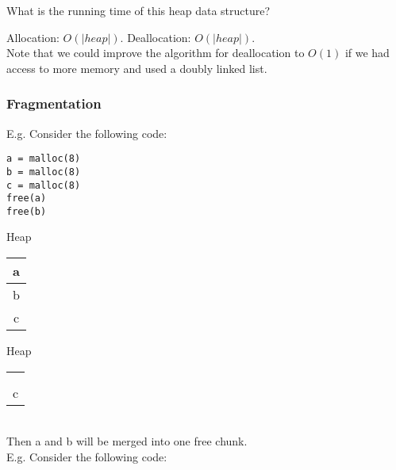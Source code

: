 \documentclass[12pt, letterpaper]{article}
\begin{document}
What is the running time of this heap data structure?

Allocation: \(O(\vert heap \vert)\). Deallocation: \(O(\vert heap \vert)\).\\

Note that we could improve the algorithm for deallocation to \(O(1)\) if we had access to more memory and used a doubly linked list.

\subsubsection{Fragmentation}
E.g. Consider the following code:

\begin{minipage}[t]{0.5\textwidth}
\begin{lstlisting}
a = malloc(8)
b = malloc(8)
c = malloc(8)
free(a)
free(b)
\end{lstlisting}
\end{minipage}
\begin{minipage}[t]{0.5\textwidth}
\begin{center}

\begin{minipage}[t]{0.25\textwidth}
Heap

\begin{tabular}{|c|}
\hline
a\\
\hline
b\\
\hline
c\\
\hline
\end{tabular}
\end{minipage}
\begin{minipage}[t]{0.25\textwidth}
Heap

\begin{tabular}{|c|}
\hline
\\
\\
\hline
c\\
\hline
\end{tabular}
\end{minipage}
\end{center}
\end{minipage}\\
Then a and b will be merged into one free chunk.\\

E.g. Consider the following code:
\end{document}
